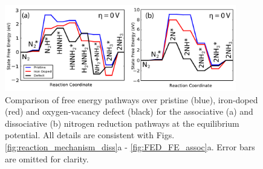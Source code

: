 \documentclass[journal=ascecg,manuscript=article,articletitle=true]{achemso}
\begin{document}
\begin{figure}
\includegraphics[width=0.9\textwidth]{figures/defect_effects.pdf}
\caption{Comparison of free energy pathways over pristine (blue), iron-doped (red) and oxygen-vacancy defect (black) for the associative (a) and dissociative (b) nitrogen reduction pathways at the equilibrium potential. All details are consistent with Figs. \ref{fig:reaction_mechanism_diss}a - \ref{fig:FED_FE_assoc}a. Error bars are omitted for clarity.}
\label{fig:defect_effects}
\end{figure}
\end{document}
